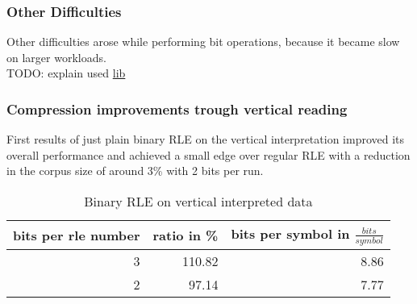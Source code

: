 \subsubsection{Other Difficulties}
\par{
Other difficulties arose while performing bit operations, because it became slow on larger workloads. \\

TODO: explain used \href{https://discuss.kotlinlang.org/t/i-o-streams-for-kotlin/9802}{lib}}

\subsubsection{Compression improvements trough vertical reading}
\par{
First results of just plain binary RLE on the vertical interpretation improved its overall performance and achieved a small edge over regular RLE with a reduction in the corpus size of around 3\% with 2 bits per run. 
\begin{table}[H]
	\centering
	\begin{tabular}{r|r|r}	
		bits per rle number & ratio in \% & bits per symbol in $\frac{bits}{symbol}$\\
		\hline
		3 & 110.82 & 8.86\\
		2 & 97.14 & 7.77 \\
	\end{tabular}
	\caption{Binary RLE on vertical interpreted data}
	\label{tab:t30 binary RLE on vertical interpreted data}
\end{table}
}

